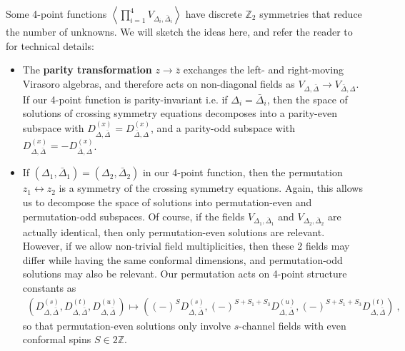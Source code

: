 \documentclass[12pt, a4paper]{article}
\newcommand{\myindex}[1]{\textbf{\boldmath #1}}
\begin{document}
Some 4-point functions $\left<\prod_{i=1}^4 V_{\Delta_i,\bar\Delta_i}\right>$ have discrete $\mathbb{Z}_2$ symmetries that reduce the number of unknowns. We will sketch the ideas here, and refer the reader to \cite[Section 2.4]{nrj23} for technical details:
\begin{itemize}
 \item The \myindex{parity transformation} $z\to \bar z$ exchanges the left- and right-moving Virasoro algebras, and therefore acts on non-diagonal fields as $V_{\Delta,\bar\Delta}\to V_{\bar\Delta,\Delta}$. If our 4-point function is parity-invariant i.e. if $\Delta_i=\bar\Delta_i$, then the space of solutions of crossing symmetry equations decomposes into a parity-even subspace with $D^{(x)}_{\Delta,\bar\Delta}=D^{(x)}_{\bar\Delta,\Delta}$, and a parity-odd subspace with $D^{(x)}_{\Delta,\bar\Delta}=-D^{(x)}_{\bar\Delta,\Delta}$. 
 \item If $(\Delta_1,\bar\Delta_1)=(\Delta_2,\bar\Delta_2)$ in our 4-point function, then 
the permutation $z_1\leftrightarrow z_2$ is a symmetry of the crossing symmetry equations. Again, this allows us to decompose the space of solutions into permutation-even and permutation-odd subspaces. Of course, if the fields $V_{\Delta_1,\bar\Delta_1}$ and $V_{\Delta_2,\bar\Delta_2}$ are actually identical, then only permutation-even solutions are relevant. However, if we allow non-trivial field multiplicities, then these 2 fields may differ while having the same conformal dimensions, and permutation-odd solutions may also be relevant. 
Our permutation acts on 4-point structure constants as 
\begin{align}
\left(D^{(s)}_{\Delta,\bar\Delta},D^{(t)}_{\Delta,\bar\Delta},D^{(u)}_{\Delta,\bar\Delta}\right) \mapsto \left((-)^{S}D^{(s)}_{\Delta,\bar\Delta},(-)^{S+S_1+S_3}D^{(u)}_{\Delta,\bar\Delta},(-)^{S+S_1+S_3}D^{(t)}_{\Delta,\bar\Delta}\right)\ ,
\end{align}
so that permutation-even solutions only involve $s$-channel fields with even conformal spins $S\in 2\mathbb{Z}$. 
\end{itemize}
\end{document}

